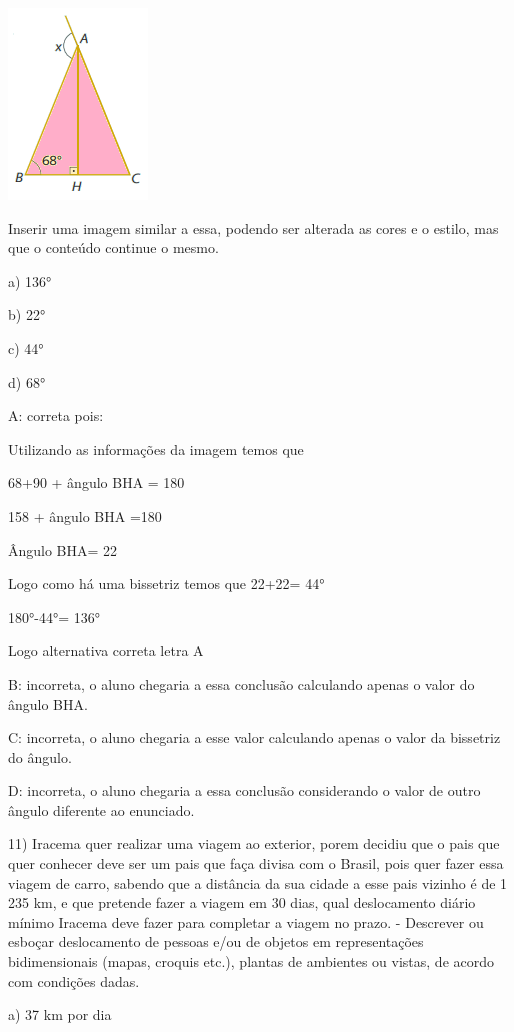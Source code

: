 \includegraphics[width=1.45833in,height=2in]{./imgSAEB_8_MAT/media/image58.png}

Inserir uma imagem similar a essa, podendo ser alterada as cores e o
estilo, mas que o conteúdo continue o mesmo.

a) 136°

b) 22°

c) 44°

d) 68°

A: correta pois:

Utilizando as informações da imagem temos que

68+90 + ângulo BHA = 180

158 + ângulo BHA =180

Ângulo BHA= 22

Logo como há uma bissetriz temos que 22+22= 44°

180°-44°= 136°

Logo alternativa correta letra A

B: incorreta, o aluno chegaria a essa conclusão calculando apenas o
valor do ângulo BHA.

C: incorreta, o aluno chegaria a esse valor calculando apenas o valor da
bissetriz do ângulo.

D: incorreta, o aluno chegaria a essa conclusão considerando o valor de
outro ângulo diferente ao enunciado.

11) Iracema quer realizar uma viagem ao exterior, porem decidiu que o
pais que quer conhecer deve ser um pais que faça divisa com o Brasil,
pois quer fazer essa viagem de carro, sabendo que a distância da sua
cidade a esse pais vizinho é de 1 235 km, e que pretende fazer a viagem
em 30 dias, qual deslocamento diário mínimo Iracema deve fazer para
completar a viagem no prazo. - Descrever ou esboçar deslocamento de
pessoas e/ou de objetos em representações bidimensionais (mapas, croquis
etc.), plantas de ambientes ou vistas, de acordo com condições dadas.

a) 37 km por dia

